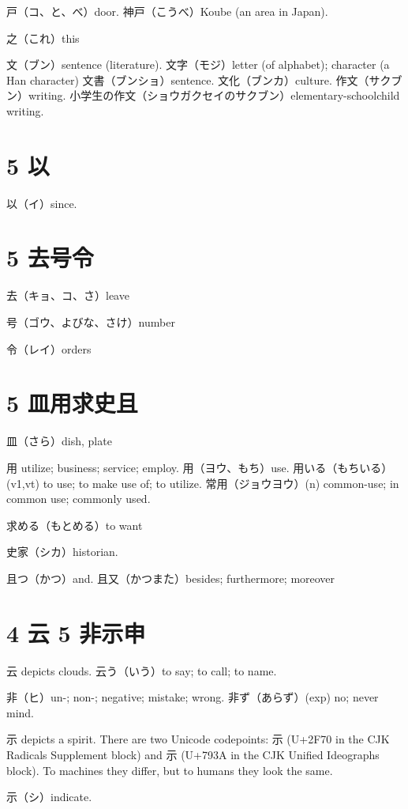 戸（コ、と、べ）door.
神戸（こうべ）Koube (an area in Japan).

之（これ）this

文（ブン）sentence (literature).
文字（モジ）letter (of alphabet); character (a Han character)
文書（ブンショ）sentence.
文化（ブンカ）culture.
作文（サクブン）writing.
小学生の作文（ショウガクセイのサクブン）elementary-schoolchild writing.

\section{5 以}

以（イ）since.

\section{5 去号令}

去（キョ、コ、さ）leave

号（ゴウ、よびな、さけ）number

令（レイ）orders

\section{5 皿用求史且}

皿（さら）dish, plate

用 utilize; business; service; employ.
用（ヨウ、もち）use.
用いる（もちいる）(v1,vt) to use; to make use of; to utilize.
常用（ジョウヨウ）(n) common-use; in common use; commonly used.

求める（もとめる）to want

史家（シカ）historian.

且つ（かつ）and.
且又（かつまた）besides; furthermore; moreover

\section{4 云 5 非示申}

云 depicts clouds.
云う（いう）to say; to call; to name.

非（ヒ）un-; non-; negative; mistake; wrong.
非ず（あらず）(exp) no; never mind.

示 depicts a spirit.
There are two Unicode codepoints:
⽰ (U+2F70 in the CJK Radicals Supplement block)
and 示 (U+793A in the CJK Unified Ideographs block).
To machines they differ,
but to humans they look the same.

示（シ）indicate.


